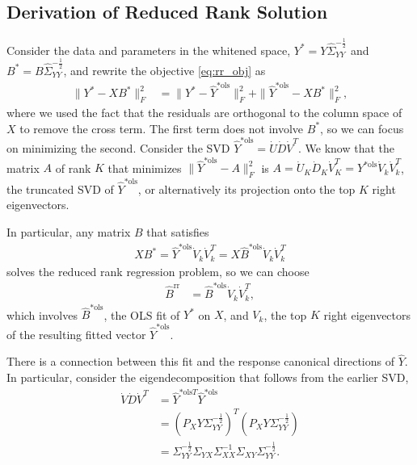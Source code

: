 \documentclass{article}
\begin{document}
\subsection{Derivation of Reduced Rank Solution}
\label{subsec:reduced_rank_derivation}

Consider the data and parameters in the whitened space, $Y^{\ast} =
Y\hat{\Sigma}_{YY}^{-\frac{1}{2}}$ and $B^{\ast} =
B\hat{\Sigma}_{YY}^{-\frac{1}{2}}$, and rewrite the objective \ref{eq:rr_obj} as
\begin{align*}
\|Y^{\ast} - XB^{\ast}\|_{F}^{2} &= \|Y^{\ast} - \hat{Y}^{\ast \text{ols}}\|_{F}^{2} + \|\hat{Y}^{\ast \text{ols}} - XB^{\ast}\|_{F}^{2},
\end{align*}
where we used the fact that the residuals are orthogonal to the column space of
$X$ to remove the cross term. The first term does not involve $B^{\ast}$, so we
can focus on minimizing the second. Consider the SVD $\hat{Y}^{\ast \text{ols}}
= \dot{U}\dot{D}\dot{V}^{T}$. We know that the matrix $A$ of rank $K$ that
minimizes $\|\hat{Y}^{\ast \text{ols}} - A\|_{F}^{2}$ is $A =
\dot{U}_{K}\dot{D}_{K}\dot{V}_{K}^{T} = Y^{\ast
  \text{ols}}\dot{V}_{k}\dot{V}_{k}^{T}$, the truncated SVD of $\hat{Y}^{\ast
  \text{ols}}$, or alternatively its projection onto the top $K$ right
eigenvectors.

In particular, any matrix $B$ that satisfies
\begin{align*}
  XB^{\ast} = \hat{Y}^{\ast \text{ols}}\dot{V}_{k}\dot{V}_{k}^{T} = X\hat{B}^{\ast \text{ols}}\dot{V}_{k}\dot{V}_{k}^{T}
\end{align*}
solves the reduced rank regression problem, so we can choose
\begin{align}
  \hat{B}^{\text{rr}} &= \hat{B}^{\ast \text{ols}}\dot{V}_{k}\dot{V}_{k}^{T}, \label{eq:brr_coef}
\end{align}
which involves $\hat{B}^{\ast \text{ols}}$, the OLS fit of $Y^{\ast}$ on $X$, and
$V_{k}$, the top $K$ right eigenvectors of the resulting fitted vector
$\hat{Y}^{\ast \text{ols}}$.

There is a connection between this fit and the response canonical directions of
$\hat{Y}$. In particular, consider the eigendecomposition that follows from the
earlier SVD,
\begin{align}
\dot{V}\dot{D}\dot{V}^{T} &=   \hat{Y}^{\ast \text{ols} T}  \hat{Y}^{\ast \text{ols}} \nonumber \\
&= \left(P_{X}Y\Sigma_{YY}^{-\frac{1}{2}}\right)^{T}\left(P_{X}Y\Sigma_{YY}^{-\frac{1}{2}}\right)\nonumber \\
  &= \Sigma_{YY}^{-\frac{1}{2}}\Sigma_{YX} \Sigma_{XX}^{-1}\Sigma_{XY}\Sigma_{YY}^{-\frac{1}{2}}. \label{eq:star_ols}
\end{align}
\end{document}
